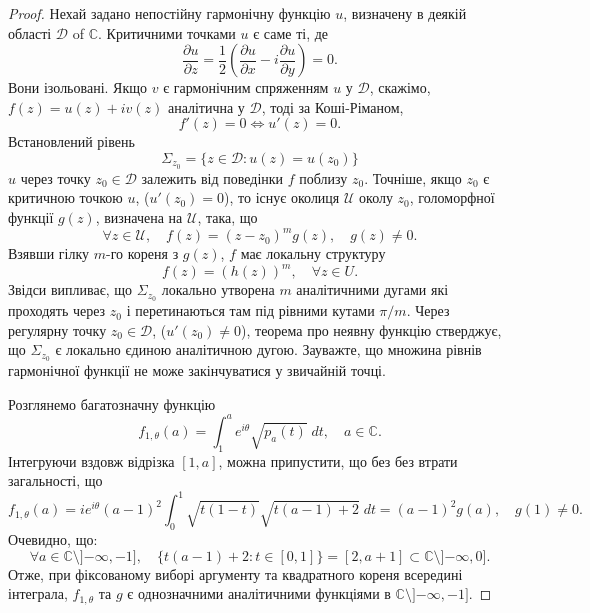 \documentclass[]{article}
\theoremstyle{plain}
\begin{document}
\begin{proof}
Нехай задано непостійну гармонічну функцію $u$, визначену в деякій області $\mathcal{D}$ of $\mathbb{C}$. Критичними точками $u$ є саме ті, де
\begin{equation*}
    \frac{\partial u}{\partial z} = \frac{1}{2} \left( \frac{\partial u}{\partial x} - i \frac{\partial u}{\partial y} \right) = 0.
\end{equation*}
Вони ізольовані. Якщо $v$ є гармонічним спряженням $u$ у $\mathcal{D}$, скажімо, $f(z) = u(z) + iv(z)$ аналітична у $\mathcal{D}$, тоді за Коші-Ріманом,
\begin{equation*}
    f'(z) = 0 \iff u'(z) = 0.
\end{equation*}
Встановлений рівень
\begin{equation*}
    \Sigma_{z_0} = \{ z \in \mathcal{D} : u(z) = u(z_0) \}
\end{equation*}
$u$ через точку $z_0 \in \mathcal{D}$ залежить від поведінки $f$ поблизу $z_0$. Точніше, якщо $z_0$ є критичною точкою $u$, ($u'(z_0) = 0$), то існує околиця $\mathcal{U}$ околу $z_0$, голоморфної функції $g(z)$, визначена на $\mathcal{U}$, така, що
\begin{equation*}
    \forall z \in \mathcal{U}, \quad f(z) = (z - z_0)^m g(z), \quad g(z) \neq 0.
\end{equation*}
Взявши гілку $m$-го кореня з $g(z)$, $f$ має локальну структуру
\begin{equation*}
     f(z) = (h(z))^m, \quad \forall z \in U.
\end{equation*}
Звідси випливає, що $\Sigma_{z_0}$ локально утворена $m$ аналітичними дугами які проходять через $z_0$ і перетинаються там під рівними кутами $\pi/m$. Через регулярну точку $z_0 \in \mathcal{D}$, ($u'(z_0) \neq 0$), теорема про неявну функцію стверджує, що $\Sigma_{z_0}$ є локально єдиною аналітичною дугою. Зауважте, що множина рівнів гармонічної функції не може закінчуватися у звичайній точці.

Розглянемо багатозначну функцію
\begin{equation*}
    f_{1,\theta}(a) = \int_{1}^{a} e^{i\theta} \sqrt{p_a(t)} \; dt, \quad a \in \mathbb{C}. 
\end{equation*}
Інтегруючи вздовж відрізка $[1, a]$, можна припустити, що без без втрати загальності, що
\begin{equation}\label{eq:formula1}
    f_{1,\theta}(a) = i e^{i\theta} (a - 1)^2 
\int_{0}^{1} \sqrt{t(1 - t)} \sqrt{t(a - 1) + 2} \; dt = (a - 1)^2 g(a), \quad g(1) \neq 0.
\end{equation}
Очевидно, що:
\begin{equation*}
    \forall a \in \mathbb{C} \setminus ]{-\infty}, -1], \quad \{ t(a - 1) + 2 : t \in [0, 1] \} = [2, a + 1] \subset \mathbb{C} \setminus ]{-\infty}, 0].
\end{equation*}
Отже, при фіксованому виборі аргументу та квадратного кореня всередині інтеграла, $f_{1,\theta}$ та $g$ є однозначними аналітичними функціями в $\mathbb{C} \setminus ]{-\infty}, -1]$.


\end{proof}
\end{document}
